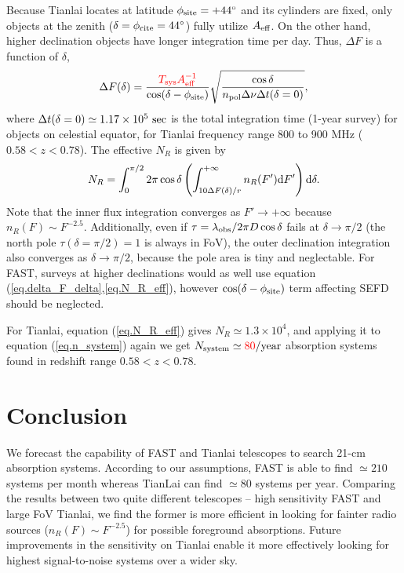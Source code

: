 \documentclass[]{raa}
\newcommand{\diff}{{\rm d}}
\newcommand{\tcr}{\textcolor{red}}
\begin{document}
Because Tianlai locates at latitude
$\phi_{\rm site}=+44^\circ$ and its cylinders are fixed, only
objects at the zenith ($\delta=\phi_{\rm cite}=44^\circ$) fully utilize
$A_{\rm eff}$. On the other hand, higher declination objects
have longer integration time per day. Thus, $\Delta F$ is
a function of $\delta$, 
\begin{equation}\label{eq.delta_F_delta}
    \Delta F(\delta) = \frac{\tcr{T_{\rm sys}A_{\rm eff}^{-1}}}{\cos(\delta-\phi_{\rm site})}
    {\sqrt{\frac{\cos\delta}{n_{\rm pol}\Delta\nu\Delta t(\delta=0)}}},
\end{equation}
where $\Delta t(\delta=0)\simeq 1.17\times 10^5\ {\rm sec}$ is the
total integration time (1-year survey) for objects on celestial equator,
for Tianlai frequency range 800 to 900 MHz ($0.58<z<0.78$).
The effective $N_R$ is given by
\begin{equation}\label{eq.N_R_eff}
    N_R=\int_0^{\pi/2}2\pi\cos\delta
    \left(\int_{10\Delta F(\delta)/r}^{+\infty}
    n_R(F')\diff F'\right)
    \diff\delta.
\end{equation}
Note that the inner flux integration converges as
$F'\rightarrow+\infty$ because $n_R(F)\sim F^{-2.5}$.
Additionally, even if $\tau=\lambda_{\rm obs}/2\pi D\cos\delta$
fails at $\delta\rightarrow\pi/2$ (the north pole
$\tau(\delta=\pi/2)=1$ is always in FoV),
the outer declination integration also converges
as $\delta\rightarrow\pi/2$, because the pole area is
tiny and neglectable.
For FAST, surveys at higher declinations would as well
use equation (\ref{eq.delta_F_delta},\ref{eq.N_R_eff}),
however $\cos(\delta-\phi_{\rm site})$ term affecting
SEFD should be neglected.

For Tianlai, equation (\ref{eq.N_R_eff}) gives $N_R\simeq 1.3\times 10^4$,
and applying it to equation (\ref{eq.n_system}) again
we get $N_{\rm system}\simeq \tcr{80} {\rm /year}$ absorption
systems found in redshift range $0.58<z<0.78$.


\section{Conclusion}\label{sec.conclusion}
We forecast the capability of FAST and Tianlai telescopes to search 21-cm
absorption systems. According to our assumptions, FAST is able
to find $\simeq 210$ systems per month
whereas TianLai can find $\simeq 80$ systems per year.
Comparing the results between two quite different telescopes --
high sensitivity FAST and large FoV Tianlai, we find the former is
more efficient in looking for fainter radio sources
($n_R(F)\sim F^{-2.5}$) for possible foreground absorptions.
Future improvements in the sensitivity on Tianlai enable it
more effectively looking for highest signal-to-noise systems
over a wider sky.
\end{document}
